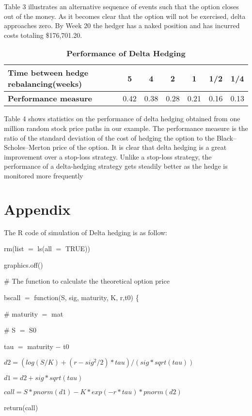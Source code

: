 \documentclass{article}
\begin{document}
Table 3 illustrates an alternative sequence of events such that the option closes out of the money. As it becomes clear that the option will not be exercised, delta approaches zero. By Week 20 the hedger has a naked position and has incurred costs totaling \$176,701.20.

\begin{table}[!htbp]
\centering
\caption{\bfseries  Performance of Delta Hedging}
\begin{tabular}{l c c c c c c}
\hline
\bfseries{Time between hedge rebalancing(weeks)} & 5 & 4  & 2 & 1 &  1/2 & 1/4 \\
\hline
\bfseries{Performance measure}	 & 0.42	 & 0.38	 & 0.28	 & 0.21	 & 0.16	 & 0.13 \\
\hline
\end{tabular}
\end{table}

Table 4 shows statistics on the performance of delta hedging obtained from one million random stock price paths in our example. The performance measure is the ratio of the standard deviation of the cost of hedging the option to the Black–Scholes–Merton price of the option. It is clear that delta hedging is a great improvement over a stop-loss strategy. Unlike a stop-loss strategy, the performance of a delta-hedging strategy gets steadily better as the hedge is monitored more frequently




\section*{Appendix}

The R code of simulation of Delta hedging is as follow:

rm(list $=$ ls(all $=$ TRUE))

graphics.off()

\# The function to calculate the theoretical option price

bscall $=$ function(S, sig, maturity, K, r,t0) \{

\# maturity $=$ mat

\# S $=$ S0

tau $=$ maturity $-$ t0

$d2 = (log(S/K) + (r - sig^2/2) * tau)/(sig * sqrt(tau))$

$d1 = d2 + sig * sqrt(tau)$

$call = S * pnorm(d1) - K * exp(-r * tau) * pnorm(d2)$

return(call)
\end{document}
